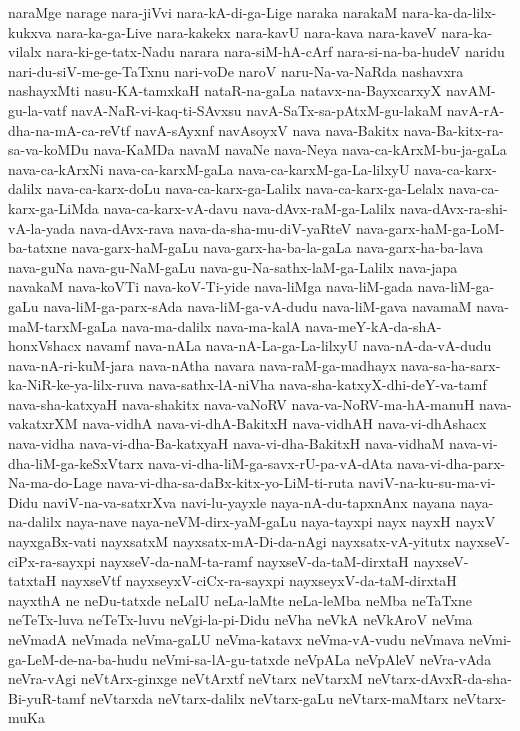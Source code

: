 {naraMge
narage
nara-jiVvi
nara-kA-di-ga-Lige
naraka
narakaM
nara-ka-da-lilx-kukxva
nara-ka-ga-Live
nara-kakekx
nara-kavU
nara-kava
nara-kaveV
nara-ka-vilalx
nara-ki-ge-tatx-Nadu
narara
nara-siM-hA-cArf
nara-si-na-ba-hudeV
naridu
nari-du-siV-me-ge-TaTxnu
nari-voDe
naroV
naru-Na-va-NaRda
nashavxra
nashayxMti
nasu-KA-tamxkaH
nataR-na-gaLa
natavx-na-BayxcarxyX
navAM-gu-la-vatf
navA-NaR-vi-kaq-ti-SAvxsu
navA-SaTx-sa-pAtxM-gu-lakaM
navA-rA-dha-na-mA-ca-reVtf
navA-sAyxnf
navAsoyxV
nava
nava-Bakitx
nava-Ba-kitx-ra-sa-va-koMDu
nava-KaMDa
navaM
navaNe
nava-Neya
nava-ca-kArxM-bu-ja-gaLa
nava-ca-kArxNi
nava-ca-karxM-gaLa
nava-ca-karxM-ga-La-lilxyU
nava-ca-karx-dalilx
nava-ca-karx-doLu
nava-ca-karx-ga-Lalilx
nava-ca-karx-ga-Lelalx
nava-ca-karx-ga-LiMda
nava-ca-karx-vA-davu
nava-dAvx-raM-ga-Lalilx
nava-dAvx-ra-shi-vA-la-yada
nava-dAvx-rava
nava-da-sha-mu-diV-yaRteV
nava-garx-haM-ga-LoM-ba-tatxne
nava-garx-haM-gaLu
nava-garx-ha-ba-la-gaLa
nava-garx-ha-ba-lava
nava-guNa
nava-gu-NaM-gaLu
nava-gu-Na-sathx-laM-ga-Lalilx
nava-japa
navakaM
nava-koVTi
nava-koV-Ti-yide
nava-liMga
nava-liM-gada
nava-liM-ga-gaLu
nava-liM-ga-parx-sAda
nava-liM-ga-vA-dudu
nava-liM-gava
navamaM
nava-maM-tarxM-gaLa
nava-ma-dalilx
nava-ma-kalA
nava-meY-kA-da-shA-honxVshacx
navamf
nava-nALa
nava-nA-La-ga-La-lilxyU
nava-nA-da-vA-dudu
nava-nA-ri-kuM-jara
nava-nAtha
navara
nava-raM-ga-madhayx
nava-sa-ha-sarx-ka-NiR-ke-ya-lilx-ruva
nava-sathx-lA-niVha
nava-sha-katxyX-dhi-deY-va-tamf
nava-sha-katxyaH
nava-shakitx
nava-vaNoRV
nava-va-NoRV-ma-hA-manuH
nava-vakatxrXM
nava-vidhA
nava-vi-dhA-BakitxH
nava-vidhAH
nava-vi-dhAshacx
nava-vidha
nava-vi-dha-Ba-katxyaH
nava-vi-dha-BakitxH
nava-vidhaM
nava-vi-dha-liM-ga-keSxVtarx
nava-vi-dha-liM-ga-savx-rU-pa-vA-dAta
nava-vi-dha-parx-Na-ma-do-Lage
nava-vi-dha-sa-daBx-kitx-yo-LiM-ti-ruta
naviV-na-ku-su-ma-vi-Didu
naviV-na-va-satxrXva
navi-lu-yayxle
naya-nA-du-tapxnAnx
nayana
naya-na-dalilx
naya-nave
naya-neVM-dirx-yaM-gaLu
naya-tayxpi
nayx
nayxH
nayxV
nayxgaBx-vati
nayxsatxM
nayxsatx-mA-Di-da-nAgi
nayxsatx-vA-yitutx
nayxseV-ciPx-ra-sayxpi
nayxseV-da-naM-ta-ramf
nayxseV-da-taM-dirxtaH
nayxseV-tatxtaH
nayxseVtf
nayxseyxV-ciCx-ra-sayxpi
nayxseyxV-da-taM-dirxtaH
nayxthA
ne
neDu-tatxde
neLalU
neLa-laMte
neLa-leMba
neMba
neTaTxne
neTeTx-luva
neTeTx-luvu
neVgi-la-pi-Didu
neVha
neVkA
neVkAroV
neVma
neVmadA
neVmada
neVma-gaLU
neVma-katavx
neVma-vA-vudu
neVmava
neVmi-ga-LeM-de-na-ba-hudu
neVmi-sa-lA-gu-tatxde
neVpALa
neVpAleV
neVra-vAda
neVra-vAgi
neVtArx-ginxge
neVtArxtf
neVtarx
neVtarxM
neVtarx-dAvxR-da-sha-Bi-yuR-tamf
neVtarxda
neVtarx-dalilx
neVtarx-gaLu
neVtarx-maMtarx
neVtarx-muKa
}
